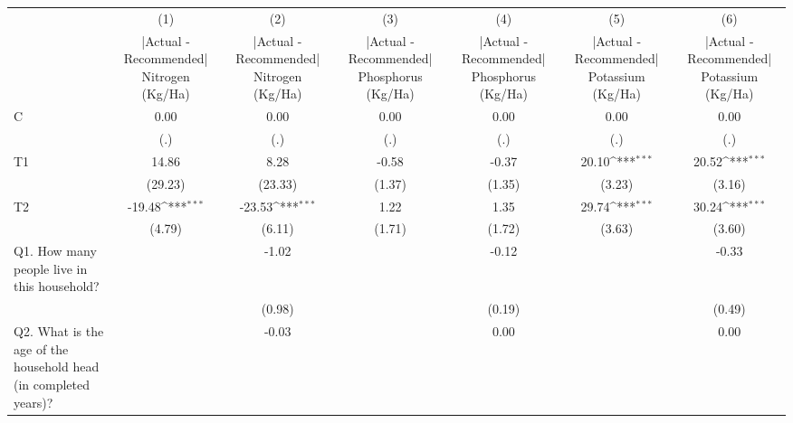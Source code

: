 {
\def\sym#1{\ifmmode^{#1}\else\(^{#1}\)\fi}
\begin{tabular}{l*{6}{c}}
\hline\hline
                    &\multicolumn{1}{c}{(1)}&\multicolumn{1}{c}{(2)}&\multicolumn{1}{c}{(3)}&\multicolumn{1}{c}{(4)}&\multicolumn{1}{c}{(5)}&\multicolumn{1}{c}{(6)}\\
                    &\multicolumn{1}{c}{|Actual - Recommended| Nitrogen (Kg/Ha)}&\multicolumn{1}{c}{|Actual - Recommended| Nitrogen (Kg/Ha)}&\multicolumn{1}{c}{|Actual - Recommended| Phosphorus (Kg/Ha)}&\multicolumn{1}{c}{|Actual - Recommended| Phosphorus (Kg/Ha)}&\multicolumn{1}{c}{|Actual - Recommended| Potassium (Kg/Ha)}&\multicolumn{1}{c}{|Actual - Recommended| Potassium (Kg/Ha)}\\
\hline
C                   &        0.00         &        0.00         &        0.00         &        0.00         &        0.00         &        0.00         \\
                    &         (.)         &         (.)         &         (.)         &         (.)         &         (.)         &         (.)         \\
[1em]
T1                  &       14.86         &        8.28         &       -0.58         &       -0.37         &       20.10\sym{***}&       20.52\sym{***}\\
                    &     (29.23)         &     (23.33)         &      (1.37)         &      (1.35)         &      (3.23)         &      (3.16)         \\
[1em]
T2                  &      -19.48\sym{***}&      -23.53\sym{***}&        1.22         &        1.35         &       29.74\sym{***}&       30.24\sym{***}\\
                    &      (4.79)         &      (6.11)         &      (1.71)         &      (1.72)         &      (3.63)         &      (3.60)         \\
[1em]
Q1. How many people live in this household?&                     &       -1.02         &                     &       -0.12         &                     &       -0.33         \\
                    &                     &      (0.98)         &                     &      (0.19)         &                     &      (0.49)         \\
[1em]
Q2. What is the age of the household head (in completed years)?&                     &       -0.03         &                     &        0.00         &                     &        0.00         \\

\end{tabular}}
